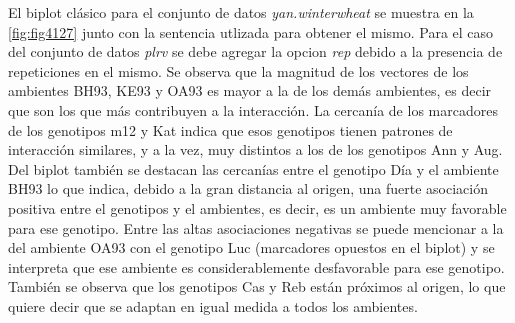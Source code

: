 El biplot clásico para el conjunto de datos \emph{yan.winterwheat} se muestra en la \ref{fig:fig4127} junto con la sentencia utlizada para obtener el mismo. Para el caso del conjunto de datos \emph{plrv} se debe agregar la opcion \emph{rep} debido a la presencia de repeticiones en el mismo.
Se observa que la magnitud de los vectores de los ambientes BH93, KE93 y OA93 es mayor a la de los demás ambientes, es decir que son los que más contribuyen a la interacción. La cercanía de los marcadores de los genotipos m12 y Kat indica que esos genotipos tienen patrones de interacción similares, y a la vez, muy distintos a los de los genotipos Ann y Aug. Del biplot también se destacan las cercanías entre el genotipo Día y el ambiente BH93 lo que indica, debido a la gran distancia al origen, una fuerte asociación positiva entre el genotipos y el ambientes, es decir, es un ambiente muy favorable para ese genotipo.
Entre las altas asociaciones negativas se puede mencionar a la del ambiente OA93 con el genotipo Luc (marcadores opuestos en el biplot) y se interpreta que ese ambiente es considerablemente desfavorable para ese genotipo. También se observa que los genotipos Cas y Reb están próximos al origen, lo que quiere decir que se adaptan en igual medida a todos los ambientes.



